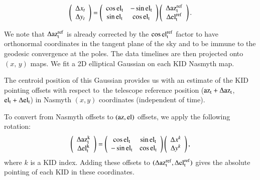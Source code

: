\documentclass[traditionalabstract]{aa}
\newcommand{\elev}{\rm{el}}
\newcommand{\az}{\rm{az}}
\newcommand{\lp}[1]{#1}
\begin{document}
{\begin{equation}
\left( {\begin{array}{c}
\Delta x_t\\
\Delta y_t \\
\end{array}} \right) = 
\left( {\begin{array}{cc}
\cos\elev_t & - \sin\elev_t  \\
\sin \elev_t & \cos \elev_t \\
\end{array}} \right)
\left( {\begin{array}{c}
\Delta \az_t^{\rm{ref}}\\
\Delta \elev_t^{\rm{ref}} \\
\end{array}} \right).
\end{equation}

We note that $\Delta\az_t^{\rm{ref}}$ is already corrected by the $\cos\elev_t^{\rm{ref}}$ factor to
have orthonormal coordinates in the tangent plane of the sky and to be immune to
the geodesic convergence at the poles.
The data timelines are then projected onto $(x,\, y)$ maps. 
We fit a 2D elliptical Gaussian on each KID Nasmyth map. {\lp The centroid
position of this Gaussian provides us with an estimate of the KID
pointing offsets with respect to\ the telescope reference position
($\az_t+\Delta\az_t$, $\elev_t+\Delta\elev_t$) in Nasmyth
$(x,y)$ coordinates (independent of time).

To convert from Nasmyth offsets to $(\az,\elev)$ offsets, we apply the
following rotation:
%
\begin{equation}
\left( {\begin{array}{c}
\Delta \az^k_t\\
\Delta \elev^k_t\\
\end{array}} \right) = 
\left( {\begin{array}{cc}
\cos\elev_t & \sin\elev_t  \\
-\sin \elev_t & \cos \elev_t \\
\end{array}} \right)
\left( {\begin{array}{c}
\Delta x^k\\
\Delta y^k\\
\end{array}} \right),
\end{equation}
%
where $k$ is a KID index. Adding these offsets to
$(\Delta \az_t^{\rm{ref}}, \Delta \elev_t^{\rm{ref}})$ gives the
absolute pointing of each KID in these coordinates.}

}
\end{document}
